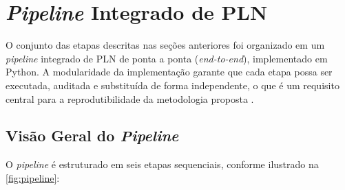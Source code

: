 
\section{\textit{Pipeline} Integrado de PLN}
\label{sec:pipeline}

O conjunto das etapas descritas nas seções anteriores foi organizado em um \textit{pipeline} integrado de PLN de ponta a ponta (\textit{end-to-end}), implementado em Python. A modularidade da implementação garante que cada etapa possa ser executada, auditada e substituída de forma independente, o que é um requisito central para a reprodutibilidade da metodologia proposta \cite{santos2023finbert}.

\subsection{Visão Geral do \textit{Pipeline}}
\label{subsec:visao_pipeline}

O \textit{pipeline} é estruturado em seis etapas sequenciais, conforme ilustrado na \autoref{fig:pipeline}:

